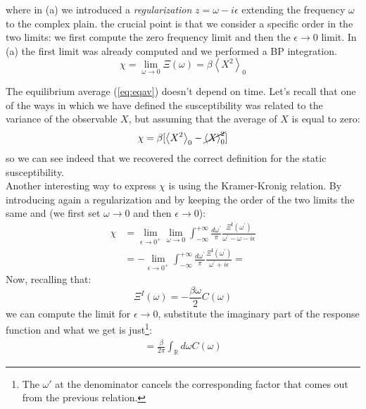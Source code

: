 \documentclass[\main/main.tex]{subfiles}
\begin{document}
where in (a) we introduced a \textit{regularization} $z=\omega-i\epsilon$ extending the frequency $\omega$ to the complex plain. the crucial point is that we consider a specific order in the two limits: we first compute the zero frequency limit and then the $\epsilon\to 0$ limit. In (a) the first limit was already computed and we performed a BP integration.
\begin{equation}
    \chi =\lim _{\omega \rightarrow 0} \Xi(\omega) = \beta\left\langle X^{2}\right\rangle_{0}
    \label{eq:eqav}
\end{equation}

The equilibrium average (\ref{eq:eqav}) doesn't depend on time.
Let's recall that one of the ways in which we have defined the susceptibility was related to the variance of the observable $X$, but assuming that the average of $X$ is equal to zero:
\begin{equation}
    \chi=\beta[\left\langle X^2 \right\rangle_0-\cancel{\left\langle X \right\rangle_0^2}]
\end{equation} 
so we can see indeed that we recovered the correct definition for the static susceptibility. \\

Another interesting way to express $\chi$ is using the Kramer-Kronig relation. By introducing again a regularization and by keeping the order of the two limits the same and (we first set $\omega\to 0$ and then $\epsilon\to 0$):
\begin{align}
    \chi &= \lim _{\epsilon \rightarrow 0^{+}}\lim _{\omega \rightarrow 0} \int_{-\infty}^{+\infty} \frac{d \omega^{\prime}}{\pi} \frac{\Xi^{\mathrm{I}}\left(\omega^{\prime}\right)}{\omega^{\prime}-\omega-i \epsilon} \\
    &=-\lim _{\epsilon \rightarrow 0^+} \int_{-\infty}^{+\infty} \frac{d \omega^{\prime}}{\pi} \frac{\Xi^{\mathrm{I}}\left(\omega^{\prime}\right)}{\omega^{\prime}+i \epsilon}=
\end{align}
Now, recalling that:
\begin{equation}
    \Xi^{I}(\omega)=-\frac{\beta\omega}{2} C(\omega)
\end{equation}
we can compute the limit for $\epsilon\to 0$, substitute the imaginary part of the response function and what we get is just\footnote{The $\omega'$ at the denominator cancels the corresponding factor that comes out from the previous relation.}:
\begin{eqnarray}
= \frac{\beta}{2\pi}\int_{\mathbb{R}}d\omega C(\omega)
\end{eqnarray}
\end{document}
